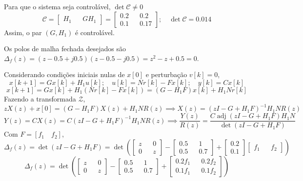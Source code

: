 \documentclass{article}
\DeclareMathOperator\det{det}
\DeclareMathOperator\adj{adj}
\begin{document}
    {Para que o sistema seja controlável, $\det \mathscr{C} \ne 0$}
    \[ \mathscr{C} =
        \begin{bmatrix}
            H_1 && GH_1
        \end{bmatrix} =
        \begin{bmatrix}
            0.2 && 0.2\\
            0.1 && 0.17
        \end{bmatrix};\quad
        \det \mathscr{C} = 0.014
    \]
    {Assim, o par $(G, H_1)$ é controlável.}

    {Os polos de malha fechada desejados são $\Delta_f(z) =
    (z -0.5 +j0.5)(z-0.5 -j0.5) = z^2 -z +0.5 = 0$.}

    {Considerando condições iniciais nulas de $x[0]$ e perturbação $v[k] = 0$,}
    \[ x[k+1] = Gx[k] + H_1u[k];\quad u[k] = Nr[k] - Fx[k];\quad y[k] = Cx[k]\]
    \[ x[k+1] = Gx[k] + H_1( Nr[k] - Fx[k] ) = (G - H_1F)x[k] + H_1Nr[k]\]
    {Fazendo a transformada $\mathcal{Z}$,}
    \[ zX(z) + x[0] = (G-H_1F)X(z) + H_1NR(z) \implies X(z) = (zI -G +H_1F)^{-1} H_1NR(z) \]
    \[ Y(z) = CX(z) = C (zI -G +H_1F)^{-1} H_1NR(z)
        \implies \frac{Y(z)}{R(z)} = \frac{C\adj (zI -G +H_1F)H_1N}{\det(zI -G +H_1F)} \]
    {Com $F = [f_1\quad f_2]$,}
    \[ \Delta_f(z) = \det(zI -G +H_1F)
        = \det\left(
        \begin{bmatrix}
            z && 0\\
            0 && z
        \end{bmatrix}
        - \begin{bmatrix}
            0.5 && 1\\
            0.5 && 0.7
        \end{bmatrix}
        + \begin{bmatrix}
            0.2\\
            0.1
        \end{bmatrix}
        \begin{bmatrix}
            f_1 && f_2
        \end{bmatrix}
        \right)
    \]
    \[ \Delta_f(z)
        = \det\left(
        \begin{bmatrix}
            z && 0\\
            0 && z
        \end{bmatrix}
        - \begin{bmatrix}
            0.5 && 1\\
            0.5 && 0.7
        \end{bmatrix}
        + \begin{bmatrix}
            0.2f_1 && 0.2f_2\\
            0.1f_1 && 0.1f_2
        \end{bmatrix}
        \right)
    \]
\end{document}
